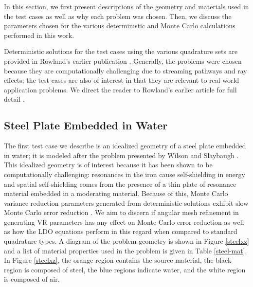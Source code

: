 \documentclass{article} %
\begin{document}
In this section, we first present descriptions of the geometry and materials
used in the test cases as well as why each problem was chosen. Then, we
discuss the parameters chosen for the various deterministic and Monte Carlo
calculations performed in this work.

Deterministic solutions for the test cases using the various quadrature sets
are provided in Rowland's earlier publication \cite{kr18}. Generally, the
problems were chosen because they are computationally challenging due to
streaming pathways and ray effects; the test cases are also of interest in
that they are relevant to real-world application problems. We direct the
reader to Rowland's earlier article for full detail \cite{kr18}.

\subsection{Steel Plate Embedded in Water}
\label{sec:steel_params}

The first test case we describe is an idealized geometry of a steel plate
embedded in water; it is modeled after the problem presented by Wilson and
Slaybaugh \cite{wilsonslaybaugh}. This idealized geometry is of interest
because it has been shown to be computationally challenging: resonances in the
iron cause self-shielding in energy and spatial self-shielding comes from the
presence of a thin plate of resonance material embedded in a moderating
material. Because of this, Monte Carlo variance reduction parameters generated
from deterministic solutions exhibit slow Monte Carlo error reduction
\cite{wilsonslaybaugh}. We aim to discern if angular mesh refinement in
generating VR parameters has any effect on Monte Carlo error reduction as well
as how the LDO equations perform in this regard when compared to standard
quadrature types. A diagram of the problem geometry is shown in Figure
\ref{steelxz} and a list of material properties used in the problem is given
in Table \ref{steel-mat}. In Figure \ref{steelxz}, the orange region contains
the source material, the black region is composed of steel, the blue regions
indicate water, and the white region is composed of air.
\end{document}
